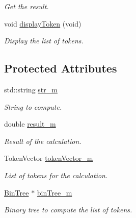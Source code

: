 \begin{DoxyCompactItemize}
\begin{DoxyCompactList}\small\item\em Get the result. \end{DoxyCompactList}\item 
\hypertarget{class_analyse_a77d54e46123bd219487cf2e2479402e6}{void \hyperlink{class_analyse_a77d54e46123bd219487cf2e2479402e6}{display\-Token} (void)}\label{class_analyse_a77d54e46123bd219487cf2e2479402e6}

\begin{DoxyCompactList}\small\item\em Display the list of tokens. \end{DoxyCompactList}\end{DoxyCompactItemize}
\subsection*{Protected Attributes}
\begin{DoxyCompactItemize}
\item 
\hypertarget{class_analyse_ace0383d76445d4f32322f7e714b2bf48}{std\-::string \hyperlink{class_analyse_ace0383d76445d4f32322f7e714b2bf48}{str\-\_\-m}}\label{class_analyse_ace0383d76445d4f32322f7e714b2bf48}

\begin{DoxyCompactList}\small\item\em String to compute. \end{DoxyCompactList}\item 
\hypertarget{class_analyse_ab3b9069ef8f159ca3bfe130570b41dd0}{double \hyperlink{class_analyse_ab3b9069ef8f159ca3bfe130570b41dd0}{result\-\_\-m}}\label{class_analyse_ab3b9069ef8f159ca3bfe130570b41dd0}

\begin{DoxyCompactList}\small\item\em Result of the calculation. \end{DoxyCompactList}\item 
\hypertarget{class_analyse_aab3807087a5686bb6857c9b9e6c05046}{Token\-Vector \hyperlink{class_analyse_aab3807087a5686bb6857c9b9e6c05046}{token\-Vector\-\_\-m}}\label{class_analyse_aab3807087a5686bb6857c9b9e6c05046}

\begin{DoxyCompactList}\small\item\em List of tokens for the calculation. \end{DoxyCompactList}\item 
\hypertarget{class_analyse_a6539243dd10704caff86d24152859ffb}{\hyperlink{class_bin_tree}{Bin\-Tree} $\ast$ \hyperlink{class_analyse_a6539243dd10704caff86d24152859ffb}{bin\-Tree\-\_\-m}}\label{class_analyse_a6539243dd10704caff86d24152859ffb}

\begin{DoxyCompactList}\small\item\em Binary tree to compute the list of tokens. \end{DoxyCompactList}\end{DoxyCompactItemize}


